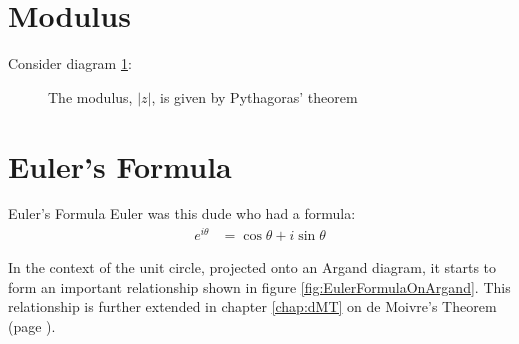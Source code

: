 \section{Modulus}
\label{sec:CP Modulus}

Consider diagram \ref{fig:modulus}:

\begin{figure}[!htb]
\begin{center}
\end{center}
\caption{The modulus, $\lvert z \rvert$, is given by Pythagoras' theorem}
\label{fig:modulus}
\end{figure}

\section{Euler's Formula}
\label{sec:CP Euler's Formula}
\begin{remember}{Euler's Formula}
Euler was this dude who had a formula:
\begin{align}
  e^{i\theta} & = \cos\theta + i\sin\theta \label{eq:eulerformula}
\end{align}
\end{remember}

\noindent In the context of the unit circle, projected onto an Argand diagram,
it starts to form an important relationship shown in figure
\ref{fig:EulerFormulaOnArgand}. This relationship is further extended in chapter
\ref{chap:dMT} on de Moivre's Theorem (page \pageref{chap:dMT}).

